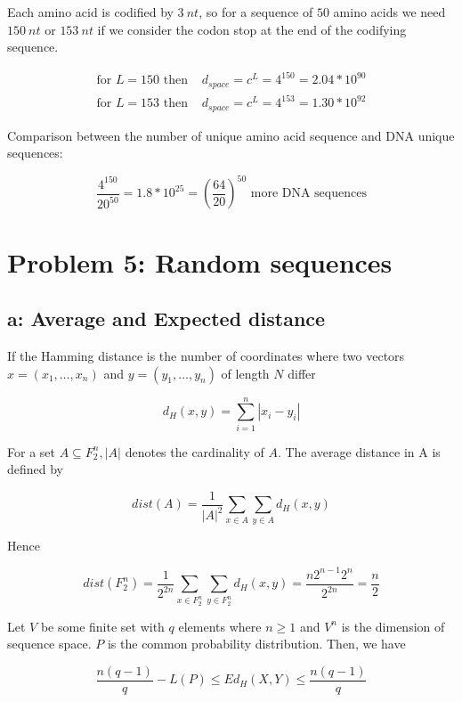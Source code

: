 Each amino acid is codified by $3~nt$, so for a sequence of $50$ amino acids we need $150~nt$ or $153~nt$ if we consider the codon stop at the end of the codifying sequence.

\begin{align}
\text{for } L = 150 \text{ then } &d_{space} = c^L =  4^{150} = 2.04*10^{90}\\
\text{for } L = 153 \text{ then } &d_{space} = c^L =  4^{153} = 1.30*10^{92}
\end{align}

Comparison between the number of unique amino acid sequence and DNA unique sequences:

\[ \frac{4^{150}}{20^{50}} = 1.8 *10^{25} = (\frac{64}{20})^{50} \text{ more DNA sequences} \]

\setcounter{chapter}{5}
\setcounter{section}{0}
\section{Problem 5: Random sequences}

\subsection{a: Average and Expected distance}

If the Hamming distance is the number of coordinates where two vectors $x = (x_1,\dots,x_n) $ and $y = (y_1, \dots, y_n)$ of length $N$ differ

\[  d_H(x,y) = \sum\limits_{i=1}^{n} | x_i -y_i |\]

For a set $A \subseteq  F^{n}_{2}, |A|$ denotes the cardinality of $A$. The average distance in A is defined by 

\begin{equation}
dist(A) = \frac{1}{|A|^2}\sum\limits_{x\in A}\sum\limits_{y\in A} d_H(x,y)
\end{equation}

Hence 

\begin{equation}
dist(F^{n}_{2}) = \frac{1}{2^{2n}}\sum\limits_{x\in F^{n}_{2}}\sum\limits_{y\in F^{n}_{2}} d_H(x,y) = \frac{n2^{n-1}2^n}{2^{2n}} = \frac{n}{2}
\end{equation}

Let $V$ be some finite set with $q$ elements where $n \geq 1$ and $V^n$ is the dimension of sequence space.  $P$ is the common probability distribution. Then, we have

\[  \frac{n(q-1)}{q} - L(P) \leq Ed_H(X,Y) \leq \frac{n(q-1)}{q} \]

